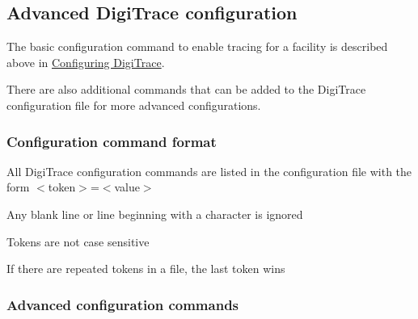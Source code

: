 \hypertarget{a00364_digitrace__advancedconfiguration}{}\subsection{Advanced Digi\+Trace configuration}\label{a00364_digitrace__advancedconfiguration}
 The basic configuration command to enable tracing for a facility is described above in \hyperlink{a00364_digitrace__configuring}{Configuring Digi\+Trace}.

 There are also additional commands that can be added to the Digi\+Trace configuration file for more advanced configurations.

\hypertarget{a00364_digitrace__advancedconfiguration__commandformat}{}\subsubsection{Configuration command format}\label{a00364_digitrace__advancedconfiguration__commandformat}
 
\begin{DoxyItemize}
\item All Digi\+Trace configuration commands are listed in the configuration file with the form $<$token$>$=$<$value$>$  
\item Any blank line or line beginning with a \textquotesingle{}{\ttfamily \#}\textquotesingle{} character is ignored  
\item Tokens are not case sensitive  
\item If there are repeated tokens in a file, the last token wins  
\end{DoxyItemize}

\hypertarget{a00364_digitrace__advancedconfiguration__commands}{}\subsubsection{Advanced configuration commands}\label{a00364_digitrace__advancedconfiguration__commands}
 

